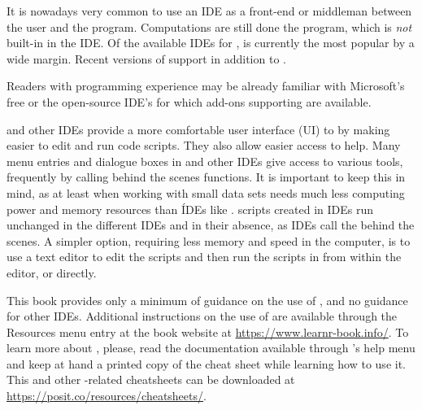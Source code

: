\documentclass[krantz2]{krantz}\usepackage{knitr}
\begin{document}
It is nowadays very common to use an IDE as a front-end or middleman between the user and the \Rpgrm program. Computations are still done the \Rpgrm program, which is \emph{not} built-in in the IDE. Of the available IDEs for \Rpgrm, \RStudio is currently the most popular by a wide margin. Recent versions of \RStudio support \pythonlang in addition to \Rlang.

\begin{explainbox}
  Readers with programming experience may be already familiar with Microsoft's free  or the open-source  IDE's for which add-ons supporting \Rpgrm are available.
\end{explainbox}

\begin{warningbox}
  \RStudio and other IDEs provide a more comfortable user interface (UI) to \Rpgrm by making easier to edit and run code scripts. They also allow easier access to \Rlang help. Many menu entries and dialogue boxes in \RStudio and other IDEs give access to various tools, frequently by calling behind the scenes \Rlang functions. It is important to keep this in mind, as \Rpgrm at least when working with small data sets needs much less computing power and memory resources than ÍDEs like \RStudio. \Rlang scripts created in IDEs run unchanged in the different IDEs and in their absence, as IDEs call the \Rpgrm behind the scenes. A simpler option, requiring less memory and speed in the computer, is to use a text editor to edit the scripts and then run the scripts in \Rpgrm from within the editor, or directly.

  This book provides only a minimum of guidance on the use of \RStudio, and no guidance for other IDEs. Additional instructions on the use of \RStudio are available through the Resources menu entry at the book website at \url{https://www.learnr-book.info/}. To learn more about \RStudio, please, read the documentation available through \RStudio's help menu and keep at hand a printed copy of the \RStudio cheat sheet while learning how to use it. This and other \Rlang-related cheatsheets can be downloaded at \url{https://posit.co/resources/cheatsheets/}.
\end{warningbox}
\end{document}
